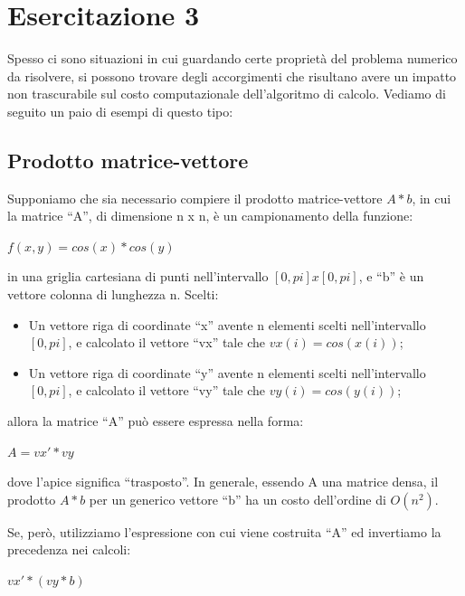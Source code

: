 \section{Esercitazione 3}

Spesso ci sono situazioni in cui guardando certe proprietà del problema numerico da risolvere, si possono trovare degli accorgimenti che risultano avere un impatto non trascurabile sul costo computazionale dell'algoritmo di calcolo. Vediamo di seguito un paio di esempi di questo tipo:

\subsection{Prodotto matrice-vettore}

Supponiamo che sia necessario compiere il prodotto matrice-vettore $A*b$,  in cui la matrice ``A'', di dimensione n x n, è un campionamento della funzione:

\begin{center}  

$f(x,y) = cos(x)*cos(y)$

\end{center}

in una griglia cartesiana di punti nell'intervallo $[0, pi] x [0, pi]$, e ``b'' è un vettore colonna di lunghezza n. Scelti:

\begin{itemize}
\item Un vettore riga di coordinate ``x'' avente n elementi scelti nell'intervallo $[0, pi]$,  e calcolato il vettore ``vx'' tale che  $vx(i) = cos(x(i))$;
\item Un vettore riga di coordinate ``y'' avente n elementi scelti nell'intervallo $[0, pi]$,  e calcolato il vettore ``vy'' tale che  $vy(i) = cos(y(i))$;
\end{itemize}

allora la matrice ``A'' può essere espressa nella forma:

\begin{center}
$A  =  vx' * vy$
\end{center}

dove l'apice significa ``trasposto''.  In generale, essendo A una matrice densa, il prodotto $A*b$ per un generico vettore ``b'' ha un costo dell'ordine di  $O(n^2)$. 

Se, però, utilizziamo l'espressione con cui viene costruita ``A'' ed invertiamo la precedenza nei calcoli:

\begin{center}
$vx' * (vy * b)$
\end{center}

